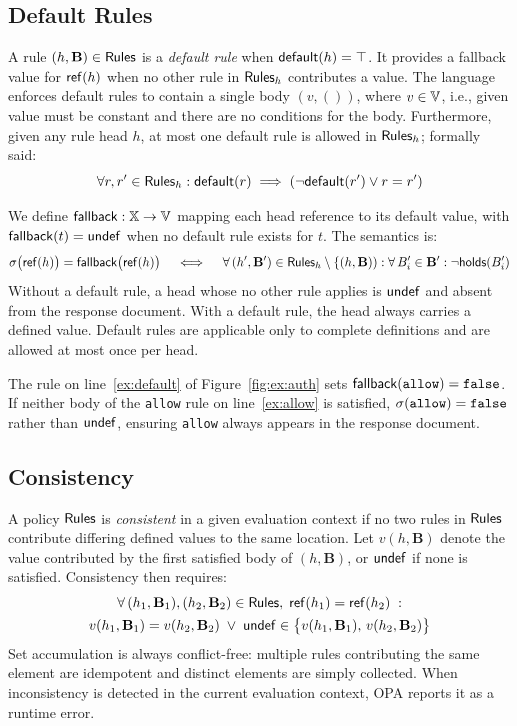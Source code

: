 
\subsection{Default Rules}
\label{ss:default}


A rule $(h, \mathbf{B}) \in \mathsf{Rules}$ is a \emph{default rule} when $\mathsf{default}(h) = \top$.
It provides a fallback value for $\mathsf{ref}(h)$ when no other rule in $\mathsf{Rules}_h$ contributes
a value.
The \rego language enforces default rules to contain a single body $(v,())$, where $v \in \mathbb{V}$, i.e., given value must be constant and there are no conditions for the body.
Furthermore, given any rule head $h$, at most one default rule is allowed in $\mathsf{Rules}_h$; formally said:
$$\forall r,r' \in \mathsf{Rules}_h: \mathsf{default}(r) \implies (\neg\mathsf{default}(r') \lor r = r')$$

We define $\mathsf{fallback} : \mathbb{X} \to \mathbb{V}$ mapping each head reference to its default value,
with $\mathsf{fallback}(t) = \mathsf{undef}$ when no default rule exists for $t$.
The semantics is:
\[
\sigma\bigl(\mathsf{ref}(h)\bigr) = \mathsf{fallback}\bigl(\mathsf{ref}(h)\bigr)
\quad \iff \quad
\forall\,(h', \mathbf{B}') \in \mathsf{Rules}_h \setminus \{(h,\mathbf{B})) :
\forall\, B'_i \in \mathbf{B}' : \neg\mathsf{holds}(B'_i)
\]
Without a default rule, a head whose no other rule applies is $\mathsf{undef}$ and absent from
the response document.
With a default rule, the head always carries a defined value.
Default rules are applicable only to complete definitions and are allowed at most once
per head.

\begin{example}
  The rule on line~\ref{ex:default} of Figure~\ref{fig:ex:auth} sets
  $\mathsf{fallback}(\texttt{allow}) = \texttt{false}$.
  If neither body of the \texttt{allow} rule on line~\ref{ex:allow} is satisfied,
  $\sigma(\texttt{allow}) = \texttt{false}$ rather than $\mathsf{undef}$, ensuring \texttt{allow}
  always appears in the response document.
\end{example}


\subsection{Consistency}
\label{ss:consistency}


A policy $\mathsf{Rules}$ is \emph{consistent} in a given evaluation context if no two rules
in $\mathsf{Rules}$ contribute differing defined values to the same location.
Let $v(h, \mathbf{B})$ denote the value contributed by the first satisfied body of
$(h, \mathbf{B})$, or $\mathsf{undef}$ if none is satisfied.
Consistency then requires:
\begin{gather*}
  \forall\,(h_1,\mathbf{B}_1),(h_2,\mathbf{B}_2) \in \mathsf{Rules},\;
  \mathsf{ref}(h_1) = \mathsf{ref}(h_2)\;: \\
  v(h_1,\mathbf{B}_1) = v(h_2,\mathbf{B}_2)
  \;\lor\;
  \mathsf{undef} \in \bigl\{v(h_1,\mathbf{B}_1),\, v(h_2,\mathbf{B}_2)\bigr\}
\end{gather*}
Set accumulation is always conflict-free: multiple rules contributing the same element
are idempotent and distinct elements are simply collected.
When inconsistency is detected in the current evaluation context, OPA reports it as a
runtime error.

